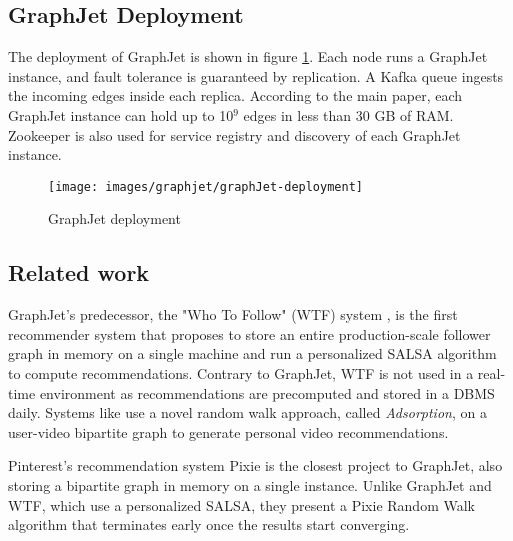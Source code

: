 \subsection{GraphJet Deployment}
\label{subsec:GraphJet-Deployment}
The deployment of GraphJet is shown in figure \ref{fig:graphJet-deployment}. Each node runs a GraphJet instance, and fault tolerance is guaranteed by replication. A Kafka queue ingests the incoming edges inside each replica. According to the main paper, each GraphJet instance can hold up to 10$^9$ edges in less than 30 GB of RAM. Zookeeper is also used for service registry and discovery of each GraphJet instance.
\begin{figure}[!htb]
    \centering
    \texttt{[image: images/graphjet/graphJet-deployment]}
    \caption{GraphJet deployment \cite{sharmaGraphJetRealtimeContent2016}}
    \label{fig:graphJet-deployment}
\end{figure}

\subsection{Related work}
\label{subsec:graphjet-related-work}
GraphJet's predecessor, the "Who To Follow" (WTF) system \cite{goelWhoToFollowSystemTwitter2015, guptaWTFWhoFollow}, is the first recommender system that proposes to store an entire production-scale follower graph in memory on a single machine and run a personalized SALSA algorithm to compute recommendations. Contrary to GraphJet, WTF is not used in a real-time environment as recommendations are precomputed and stored in a DBMS daily. Systems like \cite{balujaVideoSuggestionDiscovery2008} use a novel random walk approach, called \emph{Adsorption}, on a user-video bipartite graph to generate personal video recommendations.


Pinterest's recommendation system Pixie \cite{eksombatchaiPixieSystemRecommending2018} is the closest project to GraphJet, also storing a bipartite graph in memory on a single instance. Unlike GraphJet and WTF, which use a personalized SALSA, they present a Pixie Random Walk algorithm that terminates early once the results start converging.
